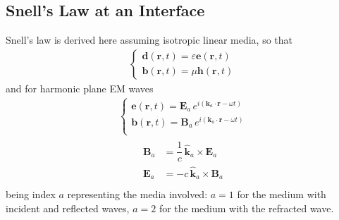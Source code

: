 \documentclass[letterpaper,10pt,english]{jupyterBook}
\begin{document}
\subsection{Snell’s Law at an Interface}
\label{\detokenize{ch/waves-plane:snell-s-law-at-an-interface}}\label{\detokenize{ch/waves-plane:classical-electromagnetism-waves-plane-waves-snell}}
\sphinxAtStartPar
Snell’s law is derived here assuming isotropic linear media, so that
\begin{equation*}
\begin{split}\begin{cases}
  \mathbf{d}(\mathbf{r},t) = \varepsilon \mathbf{e}(\mathbf{r},t) \\
  \mathbf{b}(\mathbf{r},t) = \mu         \mathbf{h}(\mathbf{r},t)
\end{cases}\end{split}
\end{equation*}
\sphinxAtStartPar
and for harmonic plane EM waves
\begin{equation*}
\begin{split}\begin{cases}
 \mathbf{e}(\mathbf{r}, t) = \mathbf{E}_{a} \, e^{i \left( \mathbf{k}_a \cdot \mathbf{r} - \omega t \right)} \\
 \mathbf{b}(\mathbf{r}, t) = \mathbf{B}_{a} \, e^{i \left( \mathbf{k}_a \cdot \mathbf{r} - \omega t \right)} \\
\end{cases}\end{split}
\end{equation*}\begin{equation*}
\begin{split}\begin{aligned}
  \mathbf{B}_a & = \dfrac{1}{c} \, \hat{\mathbf{k}}_a \times \mathbf{E}_a \\
  \mathbf{E}_a & = - c \, \hat{\mathbf{k}}_a \times \mathbf{B}_a \\
\end{aligned}\end{split}
\end{equation*}
\sphinxAtStartPar
being index \(a\) representing the media involved: \(a = 1\) for the medium with incident and reflected waves, \(a = 2\) for the medium with the refracted wave.
\end{document}
